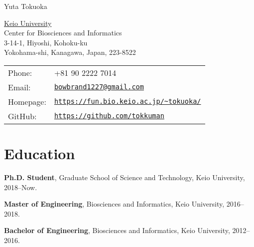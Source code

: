 \documentclass[letterpaper]{article}
\def\name{Yuta Tokuoka}
\renewenvironment{itemize}{
  \begin{list}{}{
    \setlength{\leftmargin}{1.5em}
  }
}{
  \end{list}
}
\begin{document}
{\huge \name}


\vspace{0.25in}

\begin{minipage}{0.45\linewidth}
  \href{http://www.unc.edu/}{Keio University} \\
  Center for Biosciences and Informatics \\
  3-14-1, Hiyoshi, Kohoku-ku \\
  Yokohama-shi, Kanagawa, Japan, 223-8522
\end{minipage}
\begin{minipage}{0.45\linewidth}
  \begin{tabular}{ll}
   Phone: & +81 90 2222 7014 \\
   Email: & \href{mailto:bowbrand1227@gmail.com}{\tt bowbrand1227@gmail.com} \\
   Homepage: & \href{https://fun.bio.keio.ac.jp/\~tokuoka/}{\tt \url{https://fun.bio.keio.ac.jp/\~tokuoka/}} \\
   GitHub: & \href{https://github.com/tokkuman}{\tt \url{https://github.com/tokkuman}} \\
  \end{tabular}
\end{minipage}

\vspace{0.6cm}




\section*{\bf Education}
\vspace{-0.6cm}
\hrulefill

\begin{itemize}
 \item {\bf Ph.D. Student}, Graduate School of Science and Technology, Keio University, 2018--Now.
 \item {\bf Master of Engineering}, Biosciences and Informatics, Keio University, 2016--2018.
 \item {\bf Bachelor of Engineering}, Biosciences and Informatics, Keio University, 2012--2016.
       \\
\end{itemize}
\end{document}
